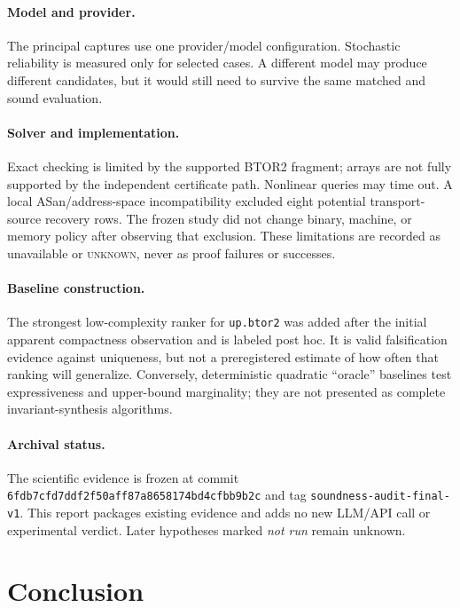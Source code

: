 \documentclass[10pt]{article}
\newcommand{\btor}{\textsc{BTOR2}}
\newcommand{\code}[1]{\texttt{#1}}
\newcommand{\unknown}{\textsc{unknown}}
\begin{document}
\paragraph{Model and provider.}
The principal captures use one provider/model configuration.  Stochastic
reliability is measured only for selected cases.  A different model may produce
different candidates, but it would still need to survive the same matched and
sound evaluation.

\paragraph{Solver and implementation.}
Exact checking is limited by the supported \btor{} fragment; arrays are not
fully supported by the independent certificate path.  Nonlinear queries may
time out.  A local ASan/address-space incompatibility excluded eight potential
transport-source recovery rows.  The frozen study did not change binary,
machine, or memory policy after observing that exclusion.  These limitations
are recorded as unavailable or \unknown{}, never as proof failures or
successes.

\paragraph{Baseline construction.}
The strongest low-complexity ranker for \code{up.btor2} was added after the
initial apparent compactness observation and is labeled post hoc.  It is valid
falsification evidence against uniqueness, but not a preregistered estimate of
how often that ranking will generalize.  Conversely, deterministic quadratic
``oracle'' baselines test expressiveness and upper-bound marginality; they are
not presented as complete invariant-synthesis algorithms.

\paragraph{Archival status.}
The scientific evidence is frozen at commit
\code{6fdb7cfd7ddf2f50aff87a8658174bd4cfbb9b2c} and tag
\code{soundness-audit-final-v1}.  This report packages existing evidence and
adds no new LLM/API call or experimental verdict.  Later hypotheses marked
\emph{not run} remain unknown.

\section{Conclusion}
\end{document}
